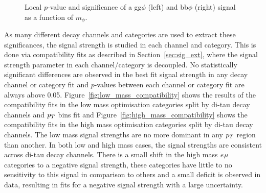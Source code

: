 \begin{figure}[!hbtp]
\centering
\caption{Local $p$-value and significance of a gg$\phi$ (left) and bb$\phi$ (right) signal as a function of $m_{\phi}$.}
\label{fig:significance}
\end{figure}

As many different decay channels and categories are used to extract these significances, the signal strength is studied in each channel and category.
This is done via compatibility fits as described in Section~\ref{sec:sig_ext}, where the signal strength parameter in each channel/category is decoupled.
No statistically significant differences are observed in the best fit signal strength in any decay channel or category fit and $p$-values between each channel or category fit are always above 0.05.
Figure~\ref{fig:low_mass_compatibility} shows the results of the compatibility fits in the low mass optimisation categories split by di-tau decay channels and $p_{T}$ bins fit and Figure~\ref{fig:high_mass_compatibility} shows the compatibility fits in the high mass optimisation categories split by di-tau decay channels.
The low mass signal strengths are no more dominant in any $p_{T}$ region than another.
In both low and high mass cases, the signal strengths are consistent across di-tau decay channels.
There is a small shift in the high mass $e_{}\mu_{}$ categories to a negative signal strength, these categories have little to no sensitivity to this signal in comparison to others and a small deficit is observed in data, resulting in fits for a negative signal strength with a large uncertainty. 


